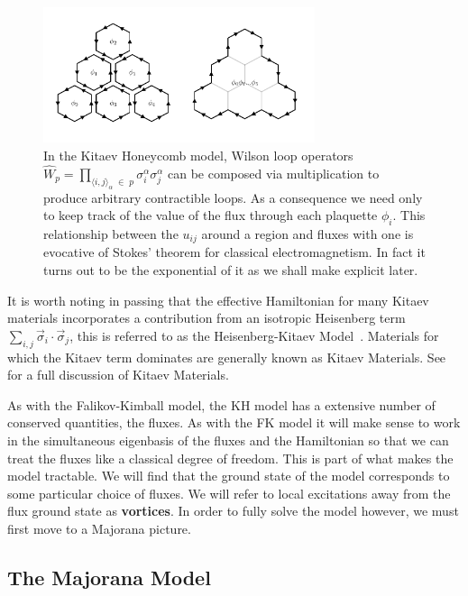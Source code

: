 \hypertarget{fig:stokes_theorem}{%
\begin{figure}
\centering
\includegraphics[width=0.71\textwidth,height=\textheight]{figure_code/amk_chapter/stokes_theorem/stokes_theorem}
\caption[{We can construct arbitrary loops from plaquette fluxes.}]{In the Kitaev Honeycomb model, Wilson loop operators \(\hat{W}_p = \prod_{\langle i,j\rangle_\alpha\; \in\; p} \sigma_i^{\alpha}\sigma_j^{\alpha}\) can be composed via multiplication to produce arbitrary contractible loops. As a consequence we need only to keep track of the value of the flux through each plaquette \(\phi_i\). This relationship between the \(u_{ij}\) around a region and fluxes with one is evocative of Stokes' theorem for classical electromagnetism. In fact it turns out to be the exponential of it as we shall make explicit later.}
\label{fig:stokes_theorem}
\end{figure}
}

It is worth noting in passing that the effective Hamiltonian for many Kitaev materials incorporates a contribution from an isotropic Heisenberg term \(\sum_{i,j} \vec{\sigma}_i\cdot\vec{\sigma}_j\), this is referred to as the Heisenberg-Kitaev Model~\autocite{Chaloupka2010}. Materials for which the Kitaev term dominates are generally known as Kitaev Materials. See~\autocite{TrebstPhysRep2022} for a full discussion of Kitaev Materials.

As with the Falikov-Kimball model, the KH model has a extensive number of conserved quantities, the fluxes. As with the FK model it will make sense to work in the simultaneous eigenbasis of the fluxes and the Hamiltonian so that we can treat the fluxes like a classical degree of freedom. This is part of what makes the model tractable. We will find that the ground state of the model corresponds to some particular choice of fluxes. We will refer to local excitations away from the flux ground state as \textbf{vortices}. In order to fully solve the model however, we must first move to a Majorana picture.

\hypertarget{the-majorana-model}{%
\subsection{The Majorana Model}\label{the-majorana-model}}

